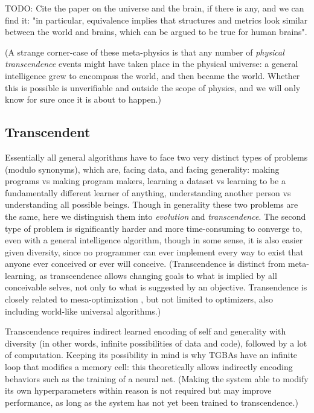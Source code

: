 \documentclass{article}
\begin{document}
    TODO: Cite the paper on the universe and the brain, if there is any, and we can find it: "in particular, equivalence implies that structures and metrics look similar between the world and brains, which can be argued to be true for human brains".

(A strange corner-case of these meta-physics is that any number of \textit{physical transcendence} events might have taken place in the physical universe: a general intelligence grew to encompass the world, and then became the world. Whether this is possible is unverifiable and outside the scope of physics, and we will only know for sure once it is about to happen.)

\subsection{Transcendent}

Essentially all general algorithms have to face two very distinct types of problems (modulo synonyms), which are, facing data, and facing generality: making programs vs making program makers, learning a dataset vs learning to be a fundamentally different learner of anything, understanding another person vs understanding all possible beings. Though in generality these two problems are the same, here we distinguish them into \textit{evolution} and \textit{transcendence}. The second type of problem is significantly harder and more time-consuming to converge to, even with a general intelligence algorithm, though in some sense, it is also easier given diversity, since no programmer can ever implement every way to exist that anyone ever conceived or ever will conceive. (Transcendence is distinct from meta-learning, as transcendence allows changing goals to what is implied by all conceivable selves, not only to what is suggested by an objective. Transendence is closely related to mesa-optimization \cite{hubinger2019risks}, but not limited to optimizers, also including world-like universal algorithms.)

Transcendence requires indirect learned encoding of self and generality with diversity (in other words, infinite possibilities of data and code), followed by a lot of computation. Keeping its possibility in mind is why TGBAs have an infinite loop that modifies a memory cell: this theoretically allows indirectly encoding behaviors such as the training of a neural net. (Making the system able to modify its own hyperparameters within reason is not required but may improve performance, as long as the system has not yet been trained to transcendence.)
\end{document}
